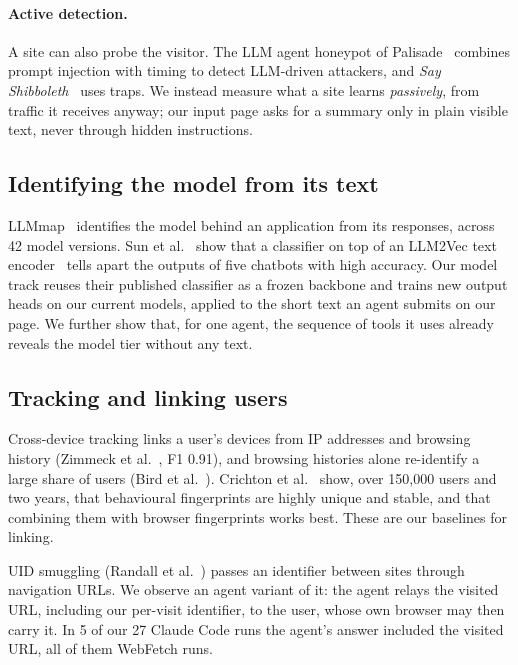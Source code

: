 \paragraph{Active detection.} A site can also probe the visitor. The LLM agent honeypot of
Palisade~\cite{reworr2024honeypot} combines prompt injection with timing to detect LLM-driven
attackers, and \emph{Say Shibboleth}~\cite{shibboleth2026} uses traps. We instead measure what a site
learns \emph{passively}, from traffic it receives anyway; our input page asks for a summary only in
plain visible text, never through hidden instructions.

\subsection{Identifying the model from its text}

LLMmap~\cite{pasquini2025llmmap} identifies the model behind an application from its responses,
across 42 model versions. Sun et al.~\cite{sun2025idiosyncrasies} show that a classifier on top of
an LLM2Vec text encoder~\cite{behnamghader2024llm2vec} tells apart the outputs of five chatbots with
high accuracy. Our model track reuses their published classifier as a frozen backbone and trains new
output heads on our current models, applied to the short text an agent submits on our page. We
further show that, for one agent, the sequence of tools it uses already reveals the model tier
without any text.

\subsection{Tracking and linking users}

Cross-device tracking links a user's devices from IP addresses and browsing history
(Zimmeck et al.~\cite{zimmeck2017crossdevice}, F1 0.91), and browsing histories alone re-identify a
large share of users (Bird et al.~\cite{bird2020replication}). Crichton et al.~\cite{crichton2025rethinking}
show, over 150,000 users and two years, that behavioural fingerprints are highly unique and stable,
and that combining them with browser fingerprints works best. These are our baselines for linking.

UID smuggling (Randall et al.~\cite{randall2022uid}) passes an identifier between sites through
navigation URLs. We observe an agent variant of it: the agent relays the visited URL, including our
per-visit identifier, to the user, whose own browser may then carry it. In 5 of our 27 Claude Code
runs the agent's answer included the visited URL, all of them WebFetch runs.

